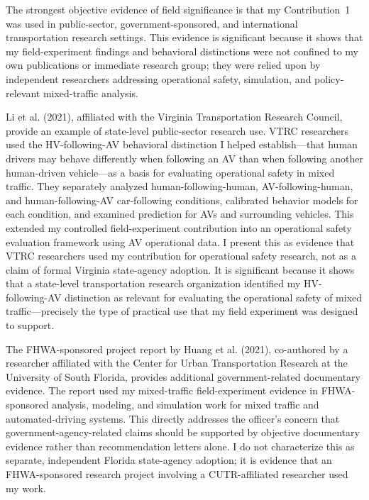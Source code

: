 \documentclass[11pt,letterpaper]{article}
\begin{document}
The strongest objective evidence of field significance is that my Contribution~1 was used in public-sector, government-sponsored, and international transportation research settings. This evidence is significant because it shows that my field-experiment findings and behavioral distinctions were not confined to my own publications or immediate research group; they were relied upon by independent researchers addressing operational safety, simulation, and policy-relevant mixed-traffic analysis.

Li et al. (2021), affiliated with the Virginia Transportation Research Council, provide an example of state-level public-sector research use. VTRC researchers used the HV-following-AV behavioral distinction I helped establish---that human drivers may behave differently when following an AV than when following another human-driven vehicle---as a basis for evaluating operational safety in mixed traffic. They separately analyzed human-following-human, AV-following-human, and human-following-AV car-following conditions, calibrated behavior models for each condition, and examined prediction for AVs and surrounding vehicles. This extended my controlled field-experiment contribution into an operational safety evaluation framework using AV operational data. I present this as evidence that VTRC researchers used my contribution for operational safety research, not as a claim of formal Virginia state-agency adoption. It is significant because it shows that a state-level transportation research organization identified my HV-following-AV distinction as relevant for evaluating the operational safety of mixed traffic---precisely the type of practical use that my field experiment was designed to support.

The FHWA-sponsored project report by Huang et al. (2021), co-authored by a researcher affiliated with the Center for Urban Transportation Research at the University of South Florida, provides additional government-related documentary evidence. The report used my mixed-traffic field-experiment evidence in FHWA-sponsored analysis, modeling, and simulation work for mixed traffic and automated-driving systems. This directly addresses the officer's concern that government-agency-related claims should be supported by objective documentary evidence rather than recommendation letters alone. I do not characterize this as separate, independent Florida state-agency adoption; it is evidence that an FHWA-sponsored research project involving a CUTR-affiliated researcher used my work.
\end{document}
